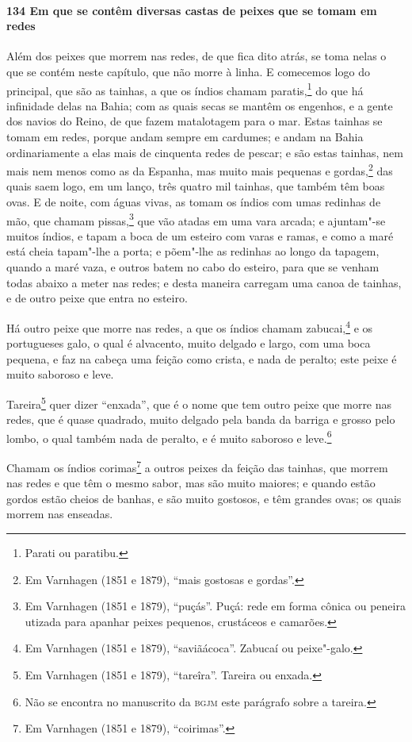 \begin{linenumbers}
\paragraph{134 Em que se contêm diversas castas de peixes que se tomam em redes}\quad
Além dos peixes que morrem nas redes, de que fica dito atrás, se toma nelas o que se
contém neste capítulo, que não morre à linha. E comecemos logo do principal, que são as
tainhas, a que os índios chamam paratis,\footnote{ Parati ou paratibu.} do que há
infinidade delas na Bahia; com as quais secas se mantêm os engenhos, e a gente dos navios
do Reino, de que fazem matalotagem para o mar. Estas tainhas se tomam em redes, porque
andam sempre em cardumes; e andam na Bahia ordinariamente a elas mais de cinquenta redes
de pescar; e são estas tainhas, nem mais nem menos como as da Espanha, mas muito mais
pequenas e gordas,\footnote{ Em Varnhagen (1851 e 1879), ``mais gostosas e gordas''.} das
quais saem logo, em um lanço, três quatro mil tainhas, que também têm boas ovas. E de
noite, com águas vivas, as tomam os índios com umas redinhas de mão, que chamam
pissas,\footnote{ Em Varnhagen (1851 e 1879), ``puçás''. Puçá: rede em forma cônica ou
peneira utizada para apanhar peixes pequenos, crustáceos e camarões.} que vão atadas em
uma vara arcada; e ajuntam"-se muitos índios, e tapam a boca de um esteiro com varas e
ramas, e como a maré está cheia tapam"-lhe a porta; e põem"-lhe as redinhas ao longo da
tapagem, quando a maré vaza, e outros batem no cabo do esteiro, para que se venham todas
abaixo a meter nas redes; e desta maneira carregam uma canoa de tainhas, e de outro peixe
que entra no esteiro.

Há outro peixe que morre nas redes, a que os índios chamam zabucai,\footnote{ Em Varnhagen
(1851 e 1879), ``saviãácoca''. Zabucaí ou peixe"-galo.} e os portugueses galo, o qual é
alvacento, muito delgado e largo, com uma boca pequena, e faz na cabeça uma feição como
crista, e nada de peralto; este peixe é muito saboroso e leve.

Tareira\footnote{ Em Varnhagen (1851 e 1879), ``tareîra''. Tareira ou enxada.} quer dizer
``enxada'', que é o nome que tem outro peixe que morre nas redes, que é quase quadrado,
muito delgado pela banda da barriga e grosso pelo lombo, o qual também nada de peralto, e
é muito saboroso e leve.\footnote{ Não se encontra no manuscrito da \textsc{bgjm} este
parágrafo sobre a tareira.}

Chamam os índios corimas\footnote{ Em Varnhagen (1851 e 1879), ``coirimas''.} a outros
peixes da feição das tainhas, que morrem nas redes e que têm o mesmo sabor, mas são muito
maiores; e quando estão gordos estão cheios de banhas, e são muito gostosos, e têm grandes
ovas; os quais morrem nas enseadas.


\end{linenumbers}
